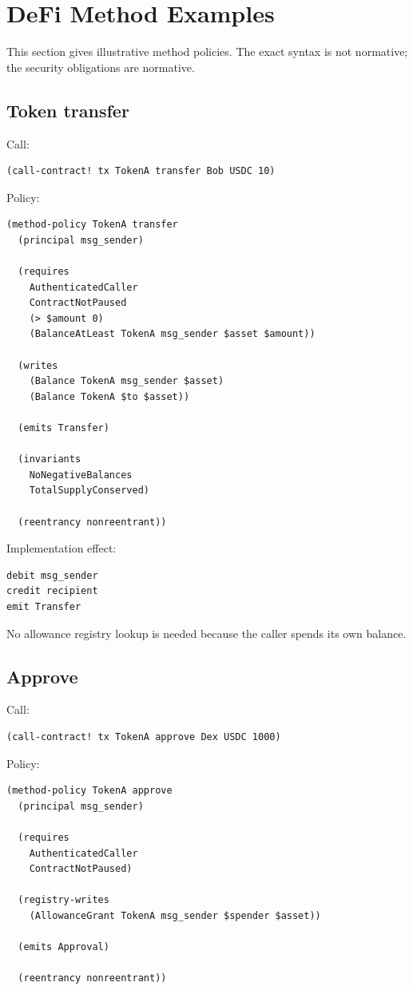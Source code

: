 \section{DeFi Method Examples}

This section gives illustrative method policies. The exact syntax is not normative; the security obligations are normative.

\subsection{Token transfer}

Call:

\begin{lstlisting}
(call-contract! tx TokenA transfer Bob USDC 10)
\end{lstlisting}

Policy:

\begin{lstlisting}
(method-policy TokenA transfer
  (principal msg_sender)

  (requires
    AuthenticatedCaller
    ContractNotPaused
    (> $amount 0)
    (BalanceAtLeast TokenA msg_sender $asset $amount))

  (writes
    (Balance TokenA msg_sender $asset)
    (Balance TokenA $to $asset))

  (emits Transfer)

  (invariants
    NoNegativeBalances
    TotalSupplyConserved)

  (reentrancy nonreentrant))
\end{lstlisting}

Implementation effect:

\begin{lstlisting}
debit msg_sender
credit recipient
emit Transfer
\end{lstlisting}

No allowance registry lookup is needed because the caller spends its own balance.

\subsection{Approve}

Call:

\begin{lstlisting}
(call-contract! tx TokenA approve Dex USDC 1000)
\end{lstlisting}

Policy:

\begin{lstlisting}
(method-policy TokenA approve
  (principal msg_sender)

  (requires
    AuthenticatedCaller
    ContractNotPaused)

  (registry-writes
    (AllowanceGrant TokenA msg_sender $spender $asset))

  (emits Approval)

  (reentrancy nonreentrant))
\end{lstlisting}

